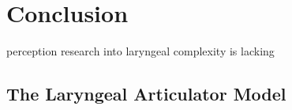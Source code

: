 \chapter{Conclusion} \label{ch:conclusion}



perception research into laryngeal complexity is lacking

\section{The Laryngeal Articulator Model}\label{sec:lam}

\citet{eslingThereAreNo2005,eslingVoiceQualityLaryngeal2019,moisikPhonologicalPotentialsLower2021,moisikMultimodalImagingGlottal2015,moisikModelingBiomechanicalInfluence2014}


